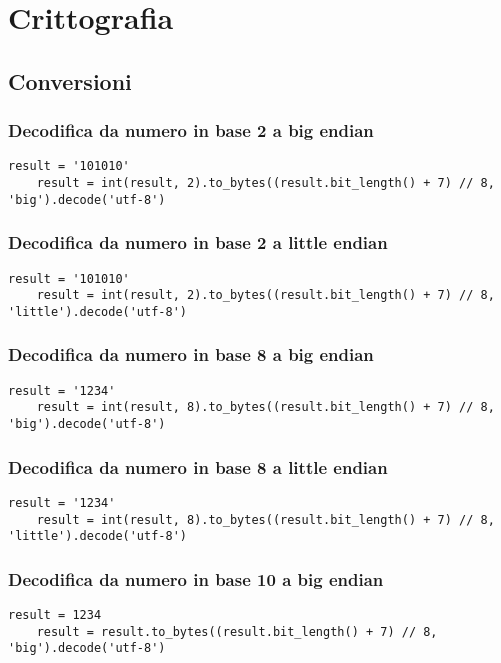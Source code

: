 \chapter{Crittografia}
\section{Conversioni}
\subsection{Decodifica da numero in base 2 a big endian}
\begin{lstlisting}[style=pythonStyle]
    result = '101010'
    result = int(result, 2).to_bytes((result.bit_length() + 7) // 8, 'big').decode('utf-8')
\end{lstlisting}
\subsection{Decodifica da numero in base 2 a little endian}
\begin{lstlisting}[style=pythonStyle]
    result = '101010'
    result = int(result, 2).to_bytes((result.bit_length() + 7) // 8, 'little').decode('utf-8')
\end{lstlisting}
\subsection{Decodifica da numero in base 8 a big endian}
\begin{lstlisting}[style=pythonStyle]
    result = '1234'
    result = int(result, 8).to_bytes((result.bit_length() + 7) // 8, 'big').decode('utf-8')
\end{lstlisting}
\subsection{Decodifica da numero in base 8 a little endian}
\begin{lstlisting}[style=pythonStyle]
    result = '1234'
    result = int(result, 8).to_bytes((result.bit_length() + 7) // 8, 'little').decode('utf-8')
\end{lstlisting}
\subsection{Decodifica da numero in base 10 a big endian}
\begin{lstlisting}[style=pythonStyle]
    result = 1234
    result = result.to_bytes((result.bit_length() + 7) // 8, 'big').decode('utf-8')
\end{lstlisting}
